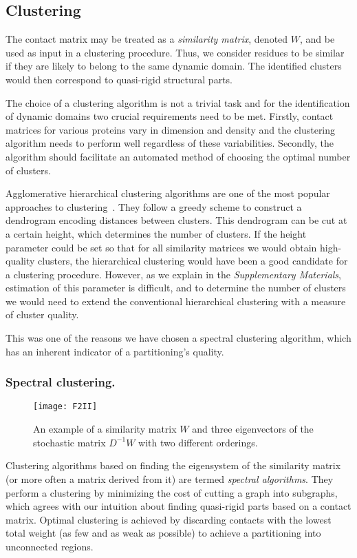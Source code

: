 \documentclass[a4paper,11pt,twoside]{book}%
\begin{document}
\subsection*{Clustering}

The contact matrix may be treated as a \emph{similarity matrix}, denoted $W$, and be used as input in a clustering procedure.
Thus, we consider residues to be similar if they are likely to belong to the same dynamic domain.
The identified clusters would then correspond to quasi-rigid structural parts.

The choice of a clustering algorithm is not a trivial task and for the identification of dynamic domains two crucial requirements need to be met.
Firstly, contact matrices for various proteins vary in dimension and density and the clustering algorithm needs to perform well regardless of these variabilities.
Secondly, the algorithm should facilitate an automated method of choosing the optimal number of clusters. 

Agglomerative hierarchical clustering algorithms are one of the most popular approaches to clustering~\cite{han2001data}.
They follow a greedy scheme to construct a dendrogram encoding distances between clusters.
This dendrogram can be cut at a certain height, which determines the number of clusters.
If the height parameter could be set so that for all similarity matrices we would obtain high-quality clusters, the hierarchical clustering would have been a good candidate for a clustering procedure.
However, as we explain in the \emph{Supplementary Materials}, estimation of this parameter is difficult, and to determine the number of clusters we would need to extend the conventional hierarchical clustering with a measure of cluster quality.

This was one of the reasons we have chosen a spectral clustering algorithm, which has an inherent indicator of a partitioning's quality.

\subsubsection*{Spectral clustering.}
\begin{figure}
\centering
\texttt{[image: F2II]}
\caption{
An example of a similarity matrix $W$ and three eigenvectors of the stochastic matrix $D^{-1}W$ with two different orderings.
}
\label{clustering}
\end{figure}

Clustering algorithms based on finding the eigensystem of the similarity matrix (or more often a matrix derived from it) are termed \emph{spectral algorithms}.
They perform a clustering by minimizing the cost of cutting a graph into subgraphs, which agrees with our intuition about finding quasi-rigid parts based on a contact matrix.
Optimal clustering is achieved by discarding contacts with the lowest total weight (as few and as weak as possible) to achieve a partitioning into unconnected regions.
\end{document}
